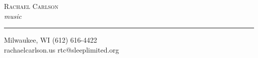 \documentclass[11pt,a4paper]{memoir}
\begin{document}
\begin{center}
\vspace*{1mm}
\textsc{\huge{Rachael Carlson}}\\
\emph{\tiny{music}}
\vspace*{7mm}
\hrule
\vfill
\tiny{Milwaukee, WI \hfill (612) 616-4422} \\ 
\tiny{rachaelcarlson.us} \hfill \tiny{rtc@sleeplimited.org} %
\end{center}
\end{document}
